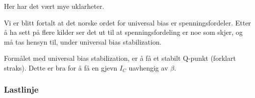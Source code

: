 Her har det vært mye uklarheter.


Vi er blitt fortalt at det norske ordet
for universal bias er spenningsfordeler.
Etter å ha sett på flere kilder ser det ut til at
spenningsfordeling er noe som skjer, og må tas hensyn til,
under universal bias stabilization.

Formålet med universal bias stabilization, er å få et
stabilt Q-punkt (forklart straks).
Dette er bra for å få en gjevn $I_C$ uavhengig av $\beta$.

\subsubsection{Lastlinje}

